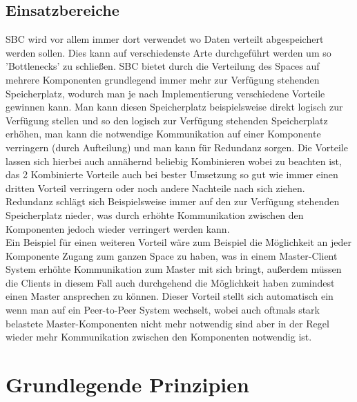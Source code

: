 \documentclass[a4paper,12pt]{scrreprt}
\begin{document}
	\section{Einsatzbereiche}
		SBC wird vor allem immer dort verwendet wo Daten verteilt abgespeichert werden sollen. Dies kann auf verschiedenste Arte durchgeführt werden um so 'Bottlenecks' %
		zu schließen. SBC bietet durch die Verteilung des Spaces auf mehrere Komponenten grundlegend immer mehr zur Verfügung stehenden Speicherplatz, wodurch man je nach Implementierung verschiedene Vorteile gewinnen kann. Man kann diesen Speicherplatz beispielsweise direkt logisch zur Verfügung stellen und so den logisch zur Verfügung stehenden Speicherplatz erhöhen, man kann die notwendige  Kommunikation auf einer Komponente verringern (durch Aufteilung) und man kann für Redundanz sorgen. Die Vorteile lassen sich hierbei auch annähernd beliebig Kombinieren wobei zu beachten ist, das 2 Kombinierte Vorteile auch bei bester Umsetzung so gut wie immer einen dritten Vorteil verringern oder noch andere Nachteile nach sich ziehen. Redundanz schlägt sich Beispielsweise immer auf den zur Verfügung stehenden Speicherplatz nieder, was durch erhöhte Kommunikation zwischen den Komponenten jedoch wieder verringert werden kann. \\    Ein Beispiel für einen weiteren Vorteil wäre zum Beispiel die Möglichkeit an jeder Komponente Zugang zum ganzen Space zu haben, was in einem Master-Client System erhöhte Kommunikation zum Master mit sich bringt, außerdem müssen die Clients in diesem Fall auch durchgehend die Möglichkeit haben zumindest einen Master ansprechen zu können. Dieser Vorteil stellt sich automatisch ein wenn man auf ein Peer-to-Peer System wechselt, wobei auch oftmals stark belastete Master-Komponenten nicht mehr notwendig sind aber in der Regel wieder mehr Kommunikation zwischen den Komponenten notwendig ist.
\chapter{Grundlegende Prinzipien}
	
\end{document}
